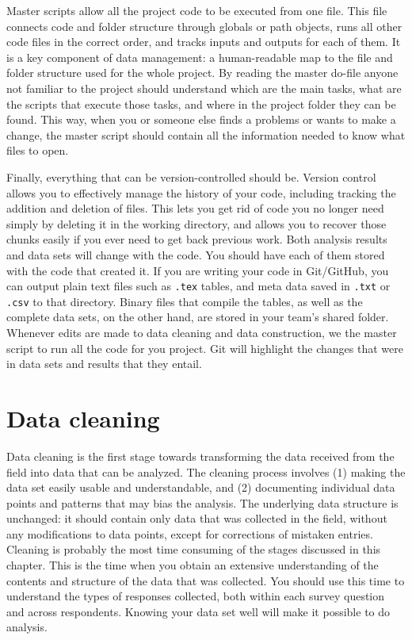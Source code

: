 Master scripts allow all the project code to be executed 
from one file.
This file connects code and folder structure through globals or path objects,
runs all other code files in the correct order,
and tracks inputs and outputs for each of them.
It is a key component of data management: 
a human-readable map to the file and folder structure used for the whole project. 
By reading the master do-file anyone not familiar to the project should
understand which are the main tasks, 
what are the scripts that execute those tasks, 
and where in the project folder they can be found.
This way, when you or someone else finds a problems or wants to make a change,
the master script should contain all the information needed
to know what files to open.

Finally, everything that can be version-controlled should be.
Version control allows you to effectively manage the history of your code,
including tracking the addition and deletion of files.
This lets you get rid of code you no longer need
simply by deleting it in the working directory,
and allows you to recover those chunks easily
if you ever need to get back previous work.
Both analysis results and data sets will change with the code.
You should have each of them stored with the code that created it.
If you are writing your code in Git/GitHub,
you can output plain text files such as \texttt{.tex} tables,
and meta data saved in \texttt{.txt} or \texttt{.csv} to that directory.
Binary files that compile the tables, as well as the complete data sets,
on the other hand, are stored in your team's shared folder.
Whenever edits are made to data cleaning and data construction, 
we the master script to run all the code for you project.
Git will highlight the changes that were in data sets and results
that they entail. 


\section{Data cleaning}

Data cleaning is the first stage towards transforming 
the data received from the field into data that can be analyzed.
The cleaning process involves
(1) making the data set easily usable and understandable, and
(2) documenting individual data points and patterns that may bias the analysis.
The underlying data structure is unchanged:
it should contain only data that was collected in the field,
without any modifications to data points,
except for corrections of mistaken entries.
Cleaning is probably the most time consuming of the stages discussed in this chapter.
This is the time when you obtain an extensive understanding of 
the contents and structure of the data that was collected.
You should use this time to understand the types of responses collected,
both within each survey question and across respondents.
Knowing your data set well will make it possible to do analysis.

